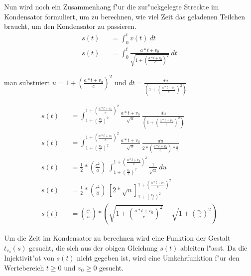 \documentclass[14pt, a4paper]{report}
\begin{document}
\newpage
Nun wird noch ein Zusammenhang f"ur die zur"uckgelegte Streckte im Kondensator formuliert,
um zu berechnen, wie viel Zeit das geladenen Teilchen braucht, um den Kondensator zu
passieren.
\begin{eqnarray}
s(t) && = \int_0^t v(t) ~dt \\
s(t) && = \int_0^t \frac{a * t + v_0}{\sqrt{1 + \left(\frac{a * t + v_0}{c}\right)^2}} ~ dt
\end{eqnarray}

man substuiert $u = 1 + \left(\frac{a * t + v_0}{c}\right)^2$ und 
$dt = \frac{du}{\left(1 + \left(\frac{a * t + v_0}{c}\right)^2\right)\dot{}}$

\begin{eqnarray}
s(t) && = \int_{1 + \left(\frac{v_0}{c}\right)^2}^{1 + \left(\frac{a*t + v_0}{c}\right)^2}  \frac{a * t + v_0}{\sqrt{u}} ~ \frac{du}{ \left({1 + \left(\frac{a * t + v_0}{c}\right)^2}\right)\dot{}}\\
s(t) && =  \int_{1 + \left(\frac{v_0}{c}\right)^2}^{1 + \left(\frac{a*t + v_0}{c}\right)^2}  \frac{a * t + v_0}{\sqrt{u}} ~ \frac{du}{2*\left(\frac{a * t + v_0}{c}\right)*\frac{a}{c}}\\
s(t) && = \frac{1}{2}*\left(\frac{c^2}{a}\right) ~ \int_{1 + \left(\frac{v_0}{c}\right)^2}^{1 + \left(\frac{a*t + v_0}{c}\right)^2} \frac{1}{\sqrt{u}} ~ du \\
s(t) && = \frac{1}{2}*\left(\frac{c^2}{a}\right)~\left[2*\sqrt{u}\right]_{1 + \left(\frac{v_0}{c}\right)^2}^{1 + \left(\frac{a*t + v_0}{c}\right)^2} \\
s(t) && = \left(\frac{c^2}{a}\right) * \left(\sqrt{1 + \left(\frac{a*t + v_0}{c}\right)^2} - \sqrt{1 + \left(\frac{v_0}{c}\right)^2}\right)
\end{eqnarray}

Um die Zeit im Kondensator zu berechnen wird eine Funktion der Gestalt $t_{v_0}(s)$
gesucht, die sich aus der obigen Gleichung $s(t)$ ableiten l"asst. Da die Injektivit"at 
\footnotemark {} von $s(t)$ nicht gegeben ist, wird eine 
Umkehrfunktion f"ur den Wertebereich $t \ge 0$ und $v_0 \ge 0$ gesucht.
\end{document}
